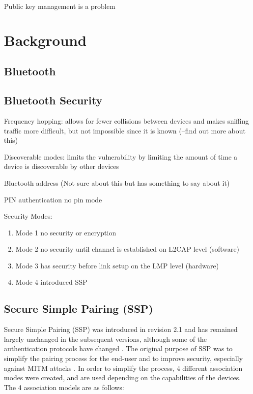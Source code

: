 \documentclass{acm_proc_article-sp}
\begin{document}
Public key management is a problem \cite{almonanimitmssp}

\section{Background}
\subsection{Bluetooth}
\subsection{Bluetooth Security}
Frequency hopping: allows for fewer collisions between devices and makes sniffing traffic more difficult, but not impossible since it is known (--find out more about this)

Discoverable modes: limits the vulnerability by limiting the amount of time a device is discoverable by other devices

Bluetooth address (Not sure about this but \cite{ma2007keystroke} has something to say about it)

PIN authentication
no pin mode

Security Modes: 
\begin{enumerate}
\item Mode 1 no security or encryption
\item Mode 2 no security until channel is established on L2CAP level (software)
\item Mode 3 has security before link setup on the LMP level (hardware)
\item Mode 4 introduced SSP
\end{enumerate}

\subsection{Secure Simple Pairing (SSP)}
Secure Simple Pairing (SSP) was introduced in revision 2.1 and has remained largely unchanged in the subsequent versions, although some of the authentication protocols have changed \cite{barnickel2012implementing}. The original purpose of SSP was to simplify the pairing process for the end-user and to improve security, especially against MITM attacks \cite{sandhya2012analysis}. In order to simplify the process, 4 different association modes were created, and are used depending on the capabilities of the devices. The 4 association models are as follows:
\end{document}
